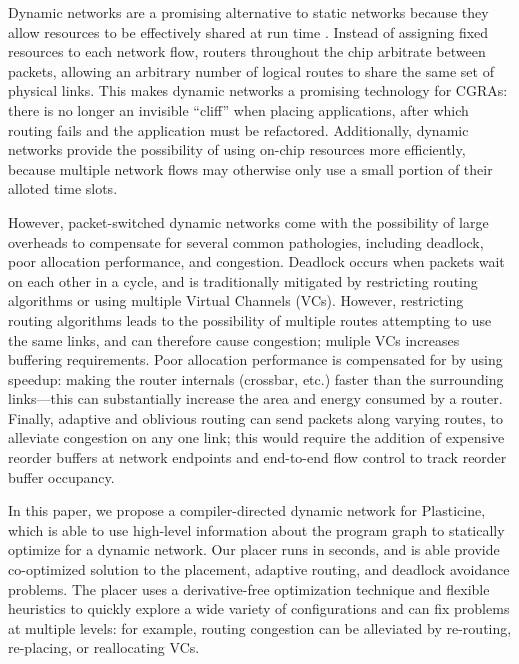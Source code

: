 Dynamic networks are a promising alternative to static networks because they allow resources to be effectively shared at run time \cite{dally2001route}.
Instead of assigning fixed resources to each network flow, routers throughout the chip arbitrate between packets, allowing an arbitrary number of logical routes to share the same set of physical links.
This makes dynamic networks a promising technology for CGRAs: there is no longer an invisible ``cliff'' when placing applications, after which routing fails and the application must be refactored.
Additionally, dynamic networks provide the possibility of using on-chip resources more efficiently, because multiple network flows may otherwise only use a small portion of their alloted time slots.

However, packet-switched dynamic networks come with the possibility of large overheads to compensate for several common pathologies, including deadlock, poor allocation performance, and congestion.
Deadlock occurs when packets wait on each other in a cycle, and is traditionally mitigated by restricting routing algorithms or using multiple Virtual Channels (VCs).
However, restricting routing algorithms leads to the possibility of multiple routes attempting to use the same links, and can therefore cause congestion; muliple VCs increases buffering requirements.
Poor allocation performance is compensated for by using speedup: making the router internals (crossbar, etc.) faster than the surrounding links---this can substantially increase the area and energy consumed by a router.
Finally, adaptive and oblivious routing can send packets along varying routes, to alleviate congestion on any one link; this would require the addition of expensive reorder buffers at network endpoints and end-to-end flow control to track reorder buffer occupancy.

In this paper, we propose a compiler-directed dynamic network for Plasticine, which is able to use high-level information about the program graph to statically optimize for a dynamic network.
Our placer runs in seconds, and is able provide co-optimized solution to the placement, adaptive routing, and deadlock avoidance problems.
The placer uses a derivative-free optimization technique and flexible heuristics to quickly explore a wide variety of configurations and can fix problems at multiple levels: for example, routing congestion can be alleviated by re-routing, re-placing, or reallocating VCs.

